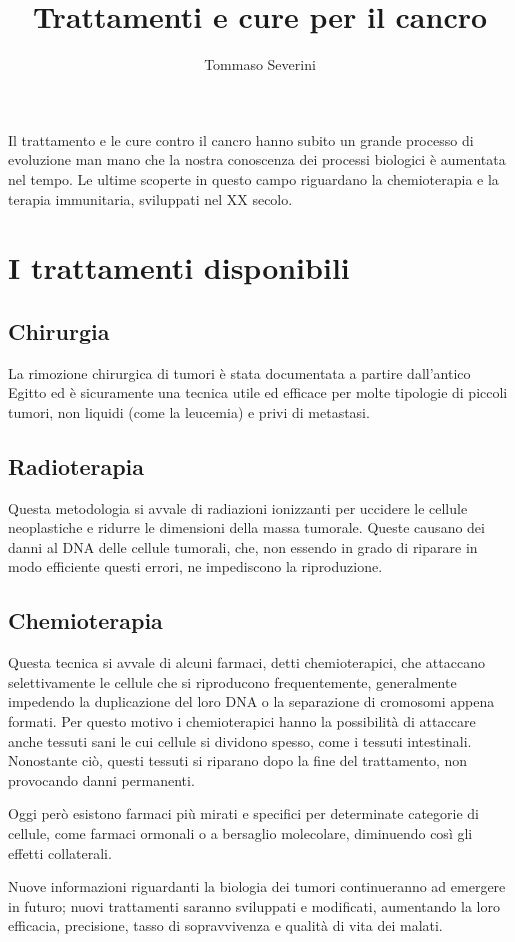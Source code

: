 \documentclass[11pt]{article}
\title{Trattamenti e cure per il cancro}
\author{Tommaso Severini}
\begin{document}
	
	\maketitle
	
Il trattamento e le cure contro il cancro hanno subito un grande processo di evoluzione man mano che la nostra conoscenza dei processi biologici è aumentata nel tempo. Le ultime scoperte in questo campo riguardano la chemioterapia e la terapia immunitaria, sviluppati nel XX secolo. 

\section*{I trattamenti disponibili}

\subsection*{Chirurgia}

La rimozione chirurgica di tumori è stata documentata a partire dall'antico  Egitto ed è sicuramente una tecnica utile ed efficace per molte tipologie di piccoli tumori, non liquidi (come la leucemia) e privi di metastasi.

\subsection*{Radioterapia}

Questa metodologia si avvale di radiazioni ionizzanti per uccidere le cellule neoplastiche e ridurre le dimensioni della massa tumorale. Queste causano dei danni al DNA delle cellule tumorali, che, non essendo in grado di riparare in modo efficiente questi errori, ne impediscono la riproduzione.

\subsection*{Chemioterapia}

Questa tecnica si avvale di alcuni farmaci, detti chemioterapici, che attaccano selettivamente le cellule che si riproducono frequentemente, generalmente impedendo la duplicazione del loro DNA o la separazione di cromosomi appena formati. Per questo motivo i chemioterapici hanno la possibilità di attaccare anche tessuti sani le cui cellule si dividono spesso, come i tessuti intestinali. Nonostante ciò, questi tessuti si riparano dopo la fine del trattamento, non provocando danni permanenti.

Oggi però esistono farmaci più mirati e specifici per determinate categorie di cellule, come farmaci ormonali o a bersaglio molecolare, diminuendo così gli effetti collaterali.

Nuove informazioni riguardanti la biologia dei tumori continueranno ad emergere in futuro; nuovi trattamenti saranno sviluppati e modificati, aumentando la loro efficacia, precisione, tasso di sopravvivenza e qualità di vita dei malati.
	
\end{document}
